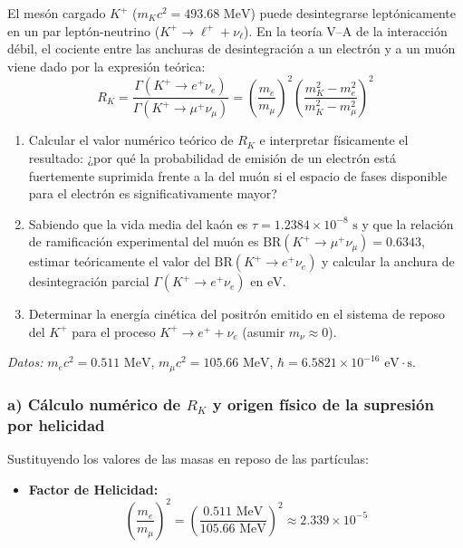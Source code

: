 \newpage
\begin{problema}
El mesón cargado $K^+$ ($m_K c^2 = 493.68 \text{ MeV}$) puede desintegrarse leptónicamente en un par leptón-neutrino ($K^+ \rightarrow \ell^+ + \nu_\ell$). En la teoría V--A de la interacción débil, el cociente entre las anchuras de desintegración a un electrón y a un muón viene dado por la expresión teórica:
\begin{equation*}
R_K = \frac{\Gamma(K^+ \rightarrow e^+ \nu_e)}{\Gamma(K^+ \rightarrow \mu^+ \nu_\mu)} = \left( \frac{m_e}{m_\mu} \right)^2 \left( \frac{m_K^2 - m_e^2}{m_K^2 - m_\mu^2} \right)^2
\end{equation*}

\begin{enumerate}[label=\alph*)]
    \item Calcular el valor numérico teórico de $R_K$ e interpretar físicamente el resultado: ¿por qué la probabilidad de emisión de un electrón está fuertemente suprimida frente a la del muón si el espacio de fases disponible para el electrón es significativamente mayor?
    \item Sabiendo que la vida media del kaón es $\tau = 1.2384 \times 10^{-8} \text{ s}$ y que la relación de ramificación experimental del muón es $\text{BR}(K^+ \rightarrow \mu^+ \nu_\mu) = 0.6343$, estimar teóricamente el valor del $\text{BR}(K^+ \rightarrow e^+ \nu_e)$ y calcular la anchura de desintegración parcial $\Gamma(K^+ \rightarrow e^+ \nu_e)$ en $\text{eV}$.
    \item Determinar la energía cinética del positrón emitido en el sistema de reposo del $K^+$ para el proceso $K^+ \rightarrow e^+ + \nu_e$ (asumir $m_\nu \approx 0$).
\end{enumerate}

\textit{Datos:} $m_e c^2 = 0.511 \text{ MeV}$, $m_\mu c^2 = 105.66 \text{ MeV}$, $\hbar = 6.5821 \times 10^{-16} \text{ eV}\cdot\text{s}$.

\tcblower

\subsubsection*{a) Cálculo numérico de $R_K$ y origen físico de la supresión por helicidad}

Sustituyendo los valores de las masas en reposo de las partículas:
\begin{itemize}
    \item \textbf{Factor de Helicidad:}
    \begin{equation*}
    \left( \frac{m_e}{m_\mu} \right)^2 = \left( \frac{0.511 \text{ MeV}}{105.66 \text{ MeV}} \right)^2  \approx 2.339 \times 10^{-5}
    \end{equation*}


\end{itemize}
\end{problema}
